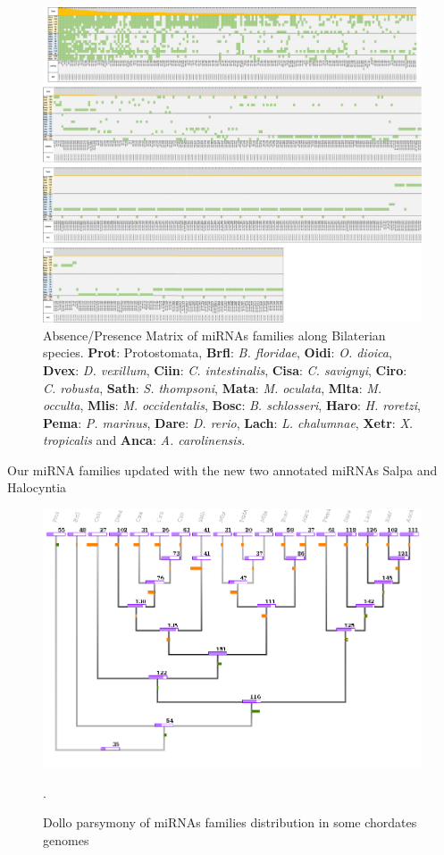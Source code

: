 \documentclass[graybox]{svmult}
\begin{document}
\begin{figure}[ht!]
\centering 
\includegraphics[width=\textwidth, angle=90]{./Images/miRNA_matrix}
\caption{Absence/Presence Matrix of miRNAs families along Bilaterian species. 
\textbf{Prot}: Protostomata, \textbf{Brfl}: \textit{B. floridae}, 
\textbf{Oidi}: \textit{O. dioica}, \textbf{Dvex}: \textit{D. vexillum}, 
\textbf{Ciin}: \textit{C. intestinalis}, \textbf{Cisa}: \textit{C. savignyi}, 
\textbf{Ciro}: \textit{C. robusta}, \textbf{Sath}: \textit{S. thompsoni}, 
\textbf{Mata}: \textit{M. oculata}, \textbf{Mlta}: \textit{M. occulta}, 
\textbf{Mlis}: \textit{M. occidentalis}, \textbf{Bosc}: \textit{B. schlosseri}, 
\textbf{Haro}: \textit{H. roretzi}, \textbf{Pema}: \textit{P. marinus}, 
\textbf{Dare}: \textit{D. rerio}, \textbf{Lach}: \textit{L. chalumnae}, 
\textbf{Xetr}: \textit{X. tropicalis} and \textbf{Anca}: \textit{A. 
carolinensis}. }
\label{fig:matrimirnas}
\end{figure}

Our miRNA families updated with the new two annotated miRNAs Salpa and 
Halocyntia

\begin{figure}[ht!]
\centering
\includegraphics[width=\textwidth]{./Images/last_tree.png}
\caption{Dollo parsymony of miRNAs families distribution in some 
chordates genomes}.
\label{fig:dollotree}
\end{figure}
\end{document}
